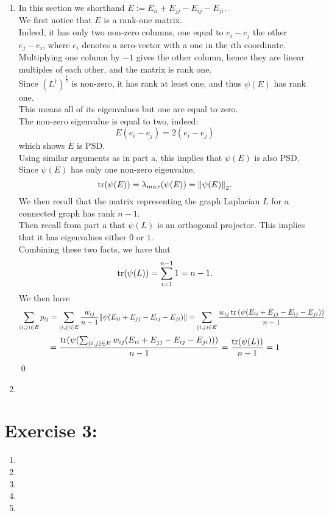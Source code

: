 \documentclass[12pt,letterpaper]{article}
\begin{document}
\begin{enumerate}
    
    \item 
In this section we shorthand $E:=E_{ii} + E_{jj} - E_{ij} - E_{ji}$.\\
We first notice that $E$ is a rank-one matrix.\\
Indeed, it has only two non-zero columns, one equal to $e_i - e_j$ the other $e_j - e_i$, 
where $e_i$ denotes a zero-vector with a one in the $i$th coordinate. Multiplying one column by $-1$
gives the other column, hence they are linear multiples of each other, and the matrix is rank one.\\
Since $(L^\dag)^{\frac{1}{2}}$ is non-zero, it has rank at least one, and thus $\psi(E)$ 
has rank one.\\
This means all of its eigenvalues but one are equal to zero.\\
The non-zero eigenvalue is equal to two, indeed:
$$
E(e_i - e_j) = 2(e_i - e_j)
$$
which shows $E$ is PSD.\\
Using similar arguments as in part a, this implies that $\psi(E)$ is also PSD.\\
Since $\psi(E)$ has only one non-zero eigenvalue, 
$$
\trace(\psi(E)) = \lambda_{max}(\psi(E)) = \norm{\psi(E)}_2.
$$
We then recall that the matrix representing the graph Laplacian $L$ for a connected graph has rank $n-1$.\\
Then recall from part a that $\psi(L)$ is an orthogonal projector. This implies that 
it has eigenvalues either $0$ or $1$. \\
Combining these two facts, we have that
$$
\trace(\psi(L)) = \sum_{i=1}^{n-1} 1 = n-1.
$$
We then have
$$
\sum_{(i,j)\in E} p_{ij} = \sum_{(i,j)\in E} \frac{w_{ij}}{n-1}\norm{\psi(E_{ii} + E_{jj} - E_{ij} - E_{ji})}
=
\sum_{(i,j)\in E} \frac{w_{ij}\trace{(\psi(E_{ii} + E_{jj} - E_{ij} - E_{ji}))}}{n-1}
$$
$$
=
\frac{\trace(\psi({\sum_{(i,j)\in E} w_{ij}(E_{ii} + E_{jj} - E_{ij} - E_{ji})))}}{n-1}
= \frac{\trace(\psi(L))}{n-1} = 1
$$
\qed


    \item
    


\end{enumerate}

\section*{Exercise 3: }
\begin{enumerate}
    \item 


    
    \item 


    
    \item
    

    \item 


    \item 


    
\end{enumerate}
\end{document}
